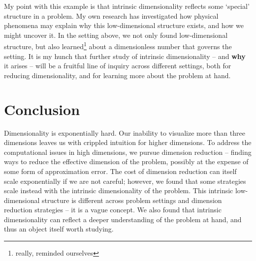 \documentclass{article}
\begin{document}
My point with this example is that intrinsic dimensionality reflects some
`special' structure in a problem. My own research has investigated how physical
phenomena may explain why this low-dimensional structure exists, and how we
might uncover it. In the setting above, we not only found low-dimensional
structure, but also learned\footnote{really, reminded ourselves} about a
dimensionless number that governs the setting. It is my hunch that further study
of intrinsic dimensionality -- and \textbf{why} it arises -- will be a fruitful
line of inquiry across different settings, both for reducing dimensionality,
and for learning more about the problem at hand.

\section{Conclusion}
Dimensionality is exponentially hard. Our inability to visualize more than three
dimensions leaves us with crippled intuition for higher dimensions. To address
the computational issues in high dimensions, we pursue dimension reduction --
finding ways to reduce the effective dimension of the problem, possibly at the
expense of some form of approximation error. The cost of dimension reduction can
itself scale exponentially if we are not careful; however, we found that some
strategies scale instead with the intrinsic dimensionality of the problem. This
intrinsic low-dimensional structure is different across problem settings and
dimension reduction strategies -- it is a vague concept. We also found that
intrinsic dimensionality can reflect a deeper understanding of the problem at
hand, and thus an object itself worth studying.

 
\end{document}
